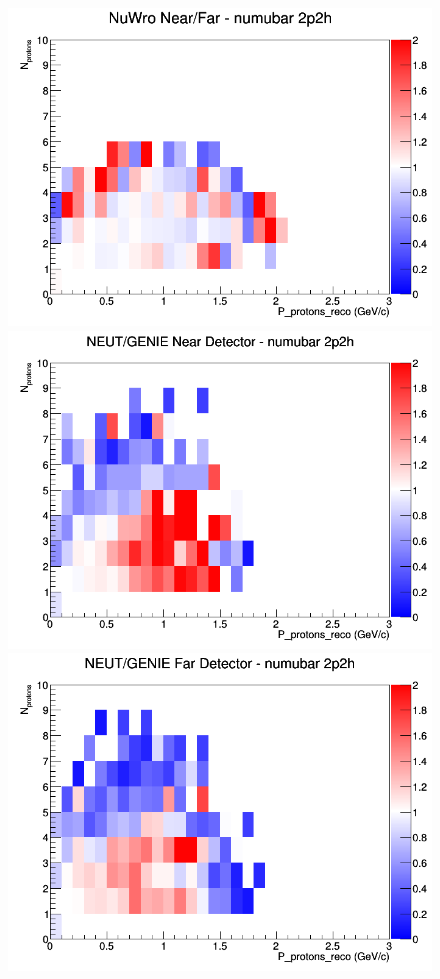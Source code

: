 \begin{figure}[h]
\endminipage
{}
\includegraphics[width=\linewidth]{eff_N_P/LAr/protons/ratios/2p2h_NuWro_numubar_NF_N_P.png}
\endminipage
\newline
{}
\includegraphics[width=\linewidth]{eff_N_P/LAr/protons/ratios/2p2h_NEUT_GENIE_numubar_near_N_P.png}
\endminipage
{}
\includegraphics[width=\linewidth]{eff_N_P/LAr/protons/ratios/2p2h_NEUT_GENIE_numubar_far_N_P.png}

\end{figure}
